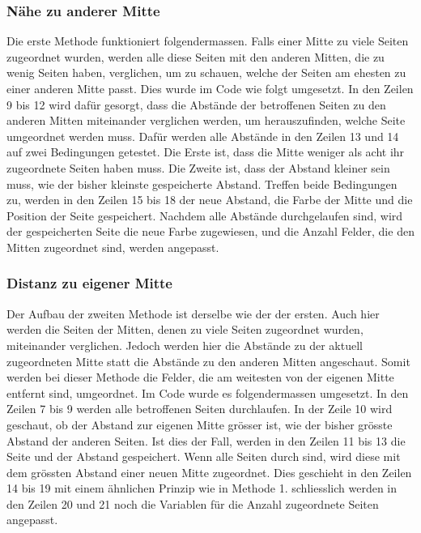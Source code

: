 \documentclass[a4paper, 12pt]{article}
\begin{document}
\subsubsection{Nähe zu anderer Mitte}
Die erste Methode funktioniert folgendermassen. Falls einer Mitte zu viele Seiten zugeordnet wurden, werden alle diese Seiten mit den anderen Mitten, die zu wenig Seiten haben, verglichen, um zu schauen, welche der Seiten am ehesten zu einer anderen Mitte passt. 
\newline
Dies wurde im Code wie folgt umgesetzt. In den Zeilen 9 bis 12 wird dafür gesorgt, dass die Abstände der betroffenen Seiten zu den anderen Mitten miteinander verglichen werden, um herauszufinden, welche Seite umgeordnet werden muss. Dafür werden alle Abstände in den Zeilen 13 und 14 auf zwei Bedingungen getestet. Die Erste ist, dass die Mitte weniger als acht ihr zugeordnete Seiten haben muss. Die Zweite ist, dass der Abstand kleiner sein muss, wie der bisher kleinste gespeicherte Abstand. Treffen beide Bedingungen zu, werden in den Zeilen 15 bis 18 der neue Abstand, die Farbe der Mitte und die Position der Seite gespeichert. Nachdem alle Abstände durchgelaufen sind, wird der gespeicherten Seite die neue Farbe zugewiesen, und die Anzahl Felder, die den Mitten zugeordnet sind, werden angepasst.

\subsubsection{Distanz zu eigener Mitte}
Der Aufbau der zweiten Methode ist derselbe wie der der ersten. Auch hier werden die Seiten der Mitten, denen zu viele Seiten zugeordnet wurden, miteinander verglichen. Jedoch werden hier die Abstände zu der aktuell zugeordneten Mitte statt die Abstände zu den anderen Mitten angeschaut. Somit werden bei dieser Methode die Felder, die am weitesten von der eigenen Mitte entfernt sind, umgeordnet.
\newline
Im Code wurde es folgendermassen umgesetzt. In den Zeilen 7 bis 9 werden alle betroffenen Seiten durchlaufen. In der Zeile 10 wird geschaut, ob der Abstand zur eigenen Mitte grösser ist, wie der bisher grösste Abstand der anderen Seiten. Ist dies der Fall, werden in den Zeilen 11 bis 13 die Seite und der Abstand gespeichert. Wenn alle Seiten durch sind, wird diese mit dem grössten Abstand einer neuen Mitte zugeordnet. Dies geschieht in den Zeilen 14 bis 19 mit einem ähnlichen Prinzip wie in Methode 1. schliesslich werden in den Zeilen 20 und 21 noch die Variablen für die Anzahl zugeordnete Seiten angepasst.

\end{document}
